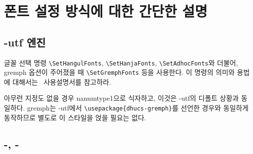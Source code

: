 \documentclass[
	12pt,
	a4paper,
	kosection,
	footnote,
	microtype,
	figtabcapt,
]{oblivoir}
\def\myREF#1#2{\ref{#1}}
\def\myLabel#1#2{\label{#1}}
\def\myREF#1#2{\ref{#2}}
\def\myLabel#1#2{\label{#2}}
\newcommand\xobclass{x\-ob\-liv\-oir\oblivoirallowbreak}
\newcommand\obclass{ob\-liv\-oir\oblivoirallowbreak}
\begin{document}

\section{폰트 설정 방식에 대한 간단한 설명}\myLabel{sec:font}{sec:폰트}

\subsection{\koTeX-utf 엔진}

글꼴 선택 명령 \verb|\SetHangulFonts|, \verb|\SetHanjaFonts|, \verb|\SetAdhocFonts|와 더불어,
gremph 옵션이 주어졌을 때 \verb|\SetGremphFonts| 등을 사용한다.
이 명령의 의미와 용법에 대해서는 \koTeX\ 사용설명서를 참고하라.

아무런 지정도 없을 경우 nanumtype1으로 식자하고, 이것은 \koTeX-utf의 디폴트 상황과 동일하다.
gremph는 \koTeX-utf에서 \verb|\usepackage{dhucs-gremph}|를 선언한 경우와 동일하게
동작하므로 별도로 이 스타일을 얹을 필요는 없다.

\subsection{\XeTeX-\ko, \LuaTeX-\ko}
\end{document}
